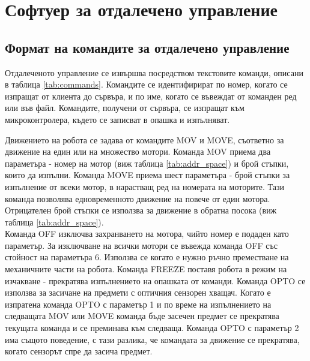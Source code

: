 \chapter{Софтуер за отдалечено управление}
\label{network_chapter}
\section{Формат на командите за отдалечено управление}
Отдалеченото управление се извършва посредством текстовите команди, описани в таблица \ref{tab:commands}. Командите се идентифирират по номер, когато се изпращат от клиента до сървъра, и по име, когато се въвеждат от команден ред или във файл. Командите, получени от сървъра, се изпращат към микроконтролера, където се записват в опашка и изпълняват.

\indent{}
Движението на робота се задава от командите MOV и MOVE, съответно за движение на един или на множество мотори. Команда MOV приема два параметъра - номер на мотор (виж таблица \ref{tab:addr_space}) и брой стъпки, които да изпълни. Команда MOVE приема шест параметъра - брой стъпки за изпълнение от всеки мотор, в нарастващ ред на номерата на моторите. Тази команда позволява едновременното движение на повече от един мотора. Отрицателен брой стъпки се използва за движение в обратна посока (виж таблица \ref{tab:addr_space}).\\
\indent{}
Команда OFF изключва захранването на мотора, чийто номер е подаден като параметър. За изключване на всички мотори се въвежда команда OFF със стойност на параметъра 6. Използва се когато е нужно ръчно преместване на механичните части на робота. Команда FREEZE поставя робота в режим на изчакване - прекратява изпълнението на опашката от команди. Команда OPTO се използва за засичане на предмети с оптичния сензорен хващач. Когато е изпратена команда OPTO с параметър 1 и по време на изпълнението на следващата MOV или MOVE команда бъде засечен предмет се прекратява текущата команда и се преминава към следваща. Команда OPTO с параметър 2 има същото поведение, с тази разлика, че командата за движение се прекратява, когато сензорът спре да засича предмет.
